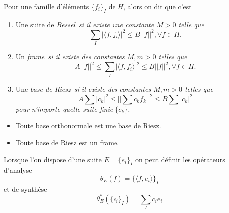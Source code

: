 \begin{definition}
	Pour une famille d'éléments $\{f_i\}_I$ de $H$, alors on dit que c'est 
	\begin{enumerate}
		\item Une suite de \it{Bessel} si il existe une constante $M>0$ telle que
			\begin{equation*}
				\sum_I |\langle f, f_i \rangle|^2 \leq B||f||^2, \forall f \in H.
			\end{equation*}
		\item Un \it{frame} si il existe des constantes $M, m>0$ telles que
			\begin{equation*}
				A||f||^2 \leq \sum_I |\langle f, f_i \rangle|^2 \leq B||f||^2, \forall f \in H.
			\end{equation*}
		\item Une \it{base de Riesz} si il existe des constantes $M, m>0$ telles que
			\begin{equation*}
				A\sum |c_k|^2 \leq ||\sum c_k f_k||^2 \leq B\sum |c_k|^2
			\end{equation*}
		pour n'importe quelle suite finie $\{c_k\}$.
	\end{enumerate}
\end{definition}
\begin{remarque}
	\begin{itemize}
		\item Toute base orthonormale est une base de Riesz.
		\item Toute base de Riesz est un frame.
	\end{itemize}
\end{remarque}
Lorsque l'on dispose d'une suite $E = \{e_i\}_I$ on peut définir les opérateurs d'analyse
\begin{equation*}
	\theta_E (f) = \{\langle f, e_i \rangle\}_I 
\end{equation*}
et de synthèse
\begin{equation*}
	\theta^*_E( \{c_i\}_I) = \sum_I c_i e_i  
\end{equation*}


